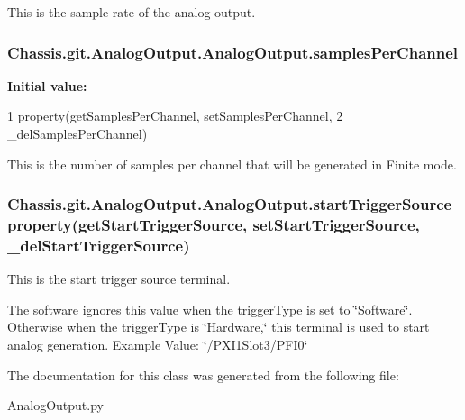 This is the sample rate of the analog output. 

\hypertarget{class_chassis_8git_1_1_analog_output_1_1_analog_output_a8084800d7b837e849ef8d28399734c8d}{
\subsubsection[{samples\-Per\-Channel}]{\setlength{\rightskip}{0pt plus 5cm}Chassis.\-git.\-Analog\-Output.\-Analog\-Output.\-samples\-Per\-Channel\hspace{0.3cm}{\ttfamily [static]}}}\label{class_chassis_8git_1_1_analog_output_1_1_analog_output_a8084800d7b837e849ef8d28399734c8d}
{\bfseries Initial value\-:}
\begin{DoxyCode}
1 property(getSamplesPerChannel, setSamplesPerChannel,
2             \_delSamplesPerChannel)
\end{DoxyCode}


This is the number of samples per channel that will be generated in Finite mode. 

\hypertarget{class_chassis_8git_1_1_analog_output_1_1_analog_output_a77277af6c02de05964114f91af9fab28}{
\subsubsection[{start\-Trigger\-Source}]{\setlength{\rightskip}{0pt plus 5cm}Chassis.\-git.\-Analog\-Output.\-Analog\-Output.\-start\-Trigger\-Source property({\bf get\-Start\-Trigger\-Source}, {\bf set\-Start\-Trigger\-Source}, \-\_\-del\-Start\-Trigger\-Source)\hspace{0.3cm}{\ttfamily [static]}}}\label{class_chassis_8git_1_1_analog_output_1_1_analog_output_a77277af6c02de05964114f91af9fab28}


This is the start trigger source terminal. 

The software ignores this value when the trigger\-Type is set to \char`\"{}\-Software\char`\"{}. Otherwise when the trigger\-Type is \char`\"{}\-Hardware,\char`\"{} this terminal is used to start analog generation. Example Value\-: \char`\"{}/\-P\-X\-I1\-Slot3/\-P\-F\-I0\char`\"{} 

The documentation for this class was generated from the following file\-:\begin{DoxyCompactItemize}
\item 
Analog\-Output.\-py\end{DoxyCompactItemize}
